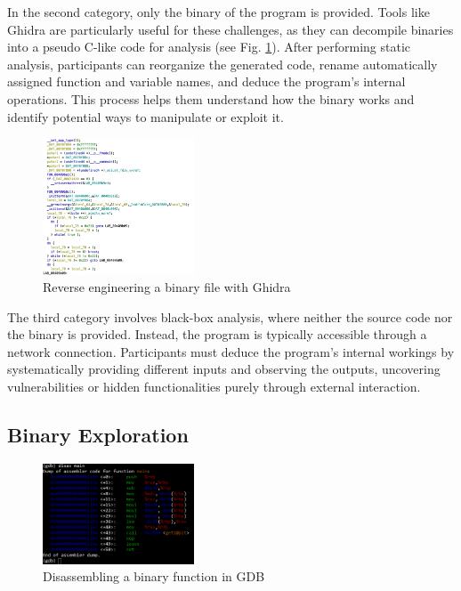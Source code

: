 \documentclass[conference]{IEEEtran}
\begin{document}
In the second category, only the binary of the program is provided. Tools like
Ghidra
\cite{eagle2020}
are particularly useful for these challenges, as they can decompile
binaries into a pseudo C-like code for analysis (see Fig. \ref{fig-ghidra}).
After performing static
analysis, participants can reorganize the generated code, rename automatically
assigned function and variable names, and deduce the program's internal
operations. This process helps them understand how the binary works and
identify potential ways to manipulate or exploit it.


\begin{figure}[htbp]
	\centering
	\includegraphics[width=0.4\textwidth]{fig/ghidra.png}
	\caption{Reverse engineering a binary file with Ghidra}
	\label{fig-ghidra}
\end{figure}

The third category involves black-box analysis, where neither the source code
nor the binary is provided. Instead, the program is typically accessible
through a network connection. Participants must deduce the program's internal
workings by systematically providing different inputs and observing the
outputs, uncovering vulnerabilities or hidden functionalities purely through
external interaction.

\subsection{Binary Exploration}

\begin{figure}[htbp]
	\centering
	\includegraphics[width=0.4\textwidth]{fig/gdb.png}
	\caption{Disassembling a binary function in GDB}
	\label{fig-gdb}
\end{figure}
\end{document}
